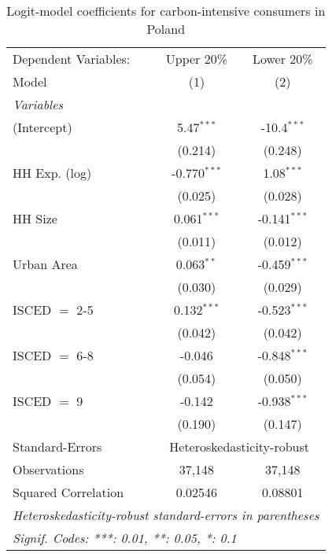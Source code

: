 
\begin{table}[htbp!]
   \centering
   \small
   \begin{adjustbox}{width = 1\textwidth, max height = 0.95\textheight, center}
      \begin{threeparttable}[b]
         \caption{\label{tab:Logit_1_POL} Logit-model coefficients for carbon-intensive consumers in Poland}
         \begin{tabular}{lcc}
            \tabularnewline \midrule \midrule
            Dependent Variables: & Upper 20\%     & Lower 20\%\\   
            Model                & (1)            & (2)\\  
            \midrule
            \emph{Variables}\\
            (Intercept)          & 5.47$^{***}$   & -10.4$^{***}$\\   
                                 & (0.214)        & (0.248)\\   
            HH Exp. (log)        & -0.770$^{***}$ & 1.08$^{***}$\\   
                                 & (0.025)        & (0.028)\\   
            HH Size              & 0.061$^{***}$  & -0.141$^{***}$\\   
                                 & (0.011)        & (0.012)\\   
            Urban Area           & 0.063$^{**}$   & -0.459$^{***}$\\   
                                 & (0.030)        & (0.029)\\   
            ISCED $=$ 2-5        & 0.132$^{***}$  & -0.523$^{***}$\\   
                                 & (0.042)        & (0.042)\\   
            ISCED $=$ 6-8        & -0.046         & -0.848$^{***}$\\   
                                 & (0.054)        & (0.050)\\   
            ISCED $=$ 9          & -0.142         & -0.938$^{***}$\\   
                                 & (0.190)        & (0.147)\\   
            \midrule 
            Standard-Errors & \multicolumn{2}{c}{Heteroskedasticity-robust} \\ 
            Observations         & 37,148         & 37,148\\  
            Squared Correlation  & 0.02546        & 0.08801\\  
            \midrule \midrule
            \multicolumn{3}{l}{\emph{Heteroskedasticity-robust standard-errors in parentheses}}\\
            \multicolumn{3}{l}{\emph{Signif. Codes: ***: 0.01, **: 0.05, *: 0.1}}\\
         \end{tabular}
         

\end{threeparttable}
\end{adjustbox}
\end{table}
